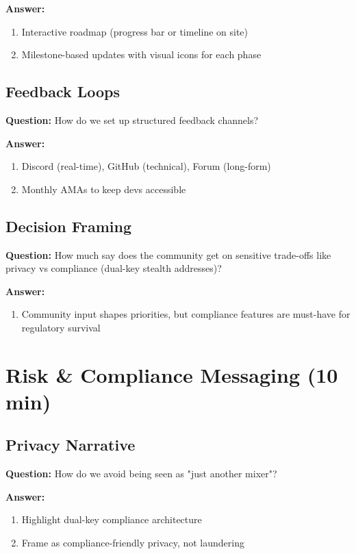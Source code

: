 \documentclass[11pt,a4paper]{article}
\begin{document}
\textbf{Answer:}
\begin{enumerate}
\item Interactive roadmap (progress bar or timeline on site)
\item Milestone-based updates with visual icons for each phase
\end{enumerate}

\subsection{Feedback Loops}
\textbf{Question:} How do we set up structured feedback channels?

\textbf{Answer:}
\begin{enumerate}
\item Discord (real-time), GitHub (technical), Forum (long-form)
\item Monthly AMAs to keep devs accessible
\end{enumerate}

\subsection{Decision Framing}
\textbf{Question:} How much say does the community get on sensitive trade-offs like privacy vs compliance (dual-key stealth addresses)?

\textbf{Answer:}
\begin{enumerate}
\item Community input shapes priorities, but compliance features are must-have for regulatory survival
\end{enumerate}

\section{Risk \& Compliance Messaging (10 min)}

\subsection{Privacy Narrative}
\textbf{Question:} How do we avoid being seen as "just another mixer"?

\textbf{Answer:}
\begin{enumerate}
\item Highlight dual-key compliance architecture
\item Frame as compliance-friendly privacy, not laundering
\end{enumerate}
\end{document}
